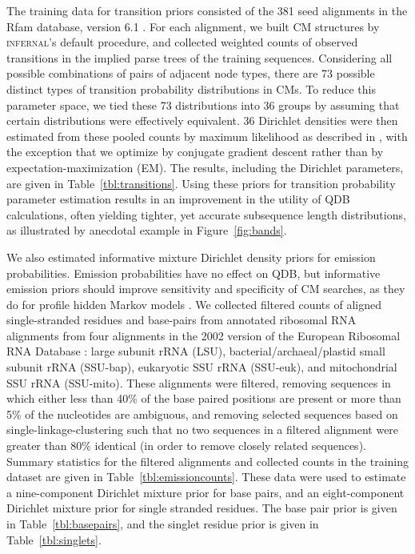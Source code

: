 \documentclass[11pt]{article}
\newif\ifdraft
\begin{document}
The training data for transition priors consisted of the 381 seed
alignments in the Rfam database, version 6.1
\cite{Griffiths-Jones05}. For each alignment, we built CM structures
by \textsc{infernal}'s default procedure, and collected weighted
counts of observed transitions in the implied parse trees of the
training sequences. Considering all possible combinations of pairs of
adjacent node types, there are 73 possible distinct types of
transition probability distributions in CMs. To reduce this parameter
space, we tied these 73 distributions into 36 groups by assuming that
certain distributions were effectively equivalent.  36 Dirichlet
densities were then estimated from these pooled counts by maximum
likelihood as described in \cite{Sjolander96}, with the exception that
we optimize by conjugate gradient descent \cite{Press93} rather than
by expectation-maximization (EM).  The results, including the
Dirichlet parameters, are given in Table~\ref{tbl:transitions}.  Using
these priors for transition probability parameter estimation results
in an improvement in the utility of QDB calculations, often yielding
tighter, yet accurate subsequence length distributions, as illustrated
by anecdotal example in Figure~\ref{fig:bands}.

\ifdraft

\fi

We also estimated informative mixture Dirichlet density priors for
emission probabilities.  Emission probabilities have no effect on QDB,
but informative emission priors should improve sensitivity and
specificity of CM searches, as they do for profile hidden Markov
models \cite{BrownM93,Sjolander96}. We collected filtered counts of
aligned single-stranded residues and base-pairs from annotated
ribosomal RNA alignments from four alignments in the 2002 version of
the European Ribosomal RNA Database \cite{Wuyts01, Wuyts02}: large
subunit rRNA (LSU), bacterial/archaeal/plastid small subunit rRNA
(SSU-bap), eukaryotic SSU rRNA (SSU-euk), and mitochondrial SSU rRNA
(SSU-mito). These alignments were filtered, removing sequences in
which either less than 40\% of the base paired positions are present
or more than 5\% of the nucleotides are ambiguous, and removing
selected sequences based on single-linkage-clustering such that no two
sequences in a filtered alignment were greater than 80\% identical (in
order to remove closely related sequences). Summary statistics for the
filtered alignments and collected counts in the training dataset are
given in Table~\ref{tbl:emissioncounts}. These data were used to
estimate a nine-component Dirichlet mixture prior for base pairs, and
an eight-component Dirichlet mixture prior for single stranded
residues. The base pair prior is given in
Table~\ref{tbl:basepairs}, and the singlet residue prior is given in
Table~\ref{tbl:singlets}. 
\end{document}
